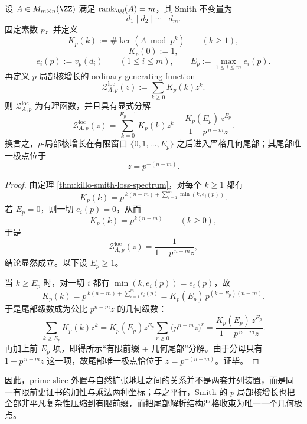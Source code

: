 \begin{theorem}\label{thm:xi-time-part62ba-padic-kernel-growth-local-zeta-single-tail-pole}
设 \(A\in M_{m\times n}(\ZZ)\) 满足 \(\operatorname{rank}_{\QQ}(A)=m\)，其 Smith 不变量为
\[
d_1\mid d_2\mid\cdots\mid d_m.
\]
固定素数 \(p\)，并定义
\[
K_p(k):=\#\ker(A\bmod p^k)
\qquad (k\ge 1),
\]
\[
K_p(0):=1,
\]
\[
e_i(p):=v_p(d_i)
\qquad (1\le i\le m),
\qquad
E_p:=\max_{1\le i\le m}e_i(p).
\]
再定义 \(p\)-局部核增长的 ordinary generating function
\[
\mathcal Z_{A,p}^{\mathrm{loc}}(z)
:=
\sum_{k\ge 0}K_p(k)z^k.
\]
则 \(\mathcal Z_{A,p}^{\mathrm{loc}}\) 为有理函数，并且具有显式分解
\[
\boxed{\;
\mathcal Z_{A,p}^{\mathrm{loc}}(z)
=
\sum_{k=0}^{E_p-1}K_p(k)z^k
+
\frac{K_p(E_p)\,z^{E_p}}{1-p^{\,n-m}z}.\;}
\]
换言之，\(p\)-局部核增长在有限窗口 \(\{0,1,\dots,E_p\}\) 之后进入严格几何尾部；其尾部唯一极点位于
\[
\boxed{\;
z=p^{-(n-m)}.\;}
\]
\end{theorem}
\begin{proof}
由定理 \ref{thm:killo-smith-loss-spectrum}，对每个 \(k\ge 1\) 都有
\[
K_p(k)
=
p^{\,k(n-m)+\sum_{i=1}^{m}\min(k,e_i(p))}.
\]
若 \(E_p=0\)，则一切 \(e_i(p)=0\)，从而
\[
K_p(k)=p^{k(n-m)}
\qquad (k\ge 0),
\]
于是
\[
\mathcal Z_{A,p}^{\mathrm{loc}}(z)=\frac{1}{1-p^{\,n-m}z},
\]
结论显然成立。以下设 \(E_p\ge 1\)。

当 \(k\ge E_p\) 时，对一切 \(i\) 都有 \(\min(k,e_i(p))=e_i(p)\)，故
\[
K_p(k)
=
p^{\,k(n-m)+\sum_{i=1}^{m}e_i(p)}
=
K_p(E_p)\,p^{(k-E_p)(n-m)}.
\]
于是尾部级数成为公比 \(p^{n-m}z\) 的几何级数：
\[
\sum_{k\ge E_p}K_p(k)z^k
=
K_p(E_p)z^{E_p}\sum_{r\ge 0}\bigl(p^{n-m}z\bigr)^r
=
\frac{K_p(E_p)\,z^{E_p}}{1-p^{\,n-m}z}.
\]
再加上前 \(E_p\) 项，即得所示“有限前缀 + 几何尾部”分解。由于分母只有 \(1-p^{\,n-m}z\) 这一项，故尾部唯一极点恰位于 \(z=p^{-(n-m)}\)。证毕。
\end{proof}

\noindent
因此，prime-slice 外置与自然扩张地址之间的关系并不是两套并列装置，而是同一有限前史证书的加性与乘法两种坐标；与之平行，Smith 的 \(p\)-局部核增长也把全部非平凡复杂性压缩到有限前缀，而把尾部解析结构严格收束为唯一一个几何极点。

\endinput
